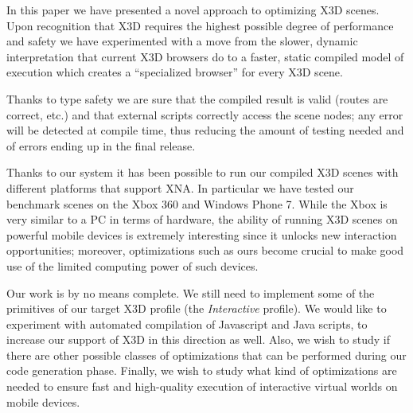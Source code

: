 
In this paper we have presented a novel approach to optimizing X3D scenes. Upon recognition that X3D requires the highest possible degree of performance and safety we have experimented with a move from the slower, dynamic interpretation that current X3D browsers do to a faster, static compiled model of execution which creates a ``specialized browser'' for every X3D scene.

Thanks to type safety we are sure that the compiled result is valid (routes are correct, etc.) and that external scripts correctly access the scene nodes; any error will be detected at compile time, thus reducing the amount of testing needed and of errors ending up in the final release.

Thanks to our system it has been possible to run our compiled X3D scenes with different platforms that support XNA. In particular we have tested our benchmark scenes on the Xbox 360 and Windows Phone 7. While the Xbox is very similar to a PC in terms of hardware, the ability of running X3D scenes on powerful mobile devices is extremely interesting since it unlocks new interaction opportunities; moreover, optimizations such as ours become crucial to make good use of the limited computing power of such devices.

Our work is by no means complete. We still need to implement some of the primitives of our target X3D profile (the \textit{Interactive} profile). We would like to experiment with automated compilation of Javascript and Java scripts, to increase our support of X3D in this direction as well. Also, we wish to study if there are other possible classes of optimizations that can be performed during our code generation phase. Finally, we wish to study what kind of optimizations are needed to ensure fast and high-quality execution of interactive virtual worlds on mobile devices.
